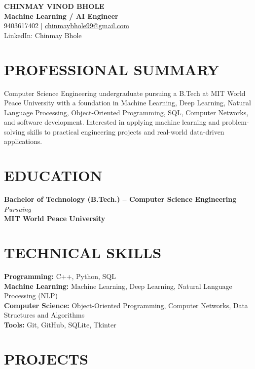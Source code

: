\documentclass[10pt,a4paper]{article}
\begin{document}
\begin{center}
{\LARGE\textbf{CHINMAY VINOD BHOLE}}\\[3pt]
\textbf{Machine Learning / AI Engineer}\\[3pt]
9403617402 \quad | \quad \href{mailto:chinmaybhole99@gmail.com}{chinmaybhole99@gmail.com}\\
LinkedIn: Chinmay Bhole
\end{center}

\section*{PROFESSIONAL SUMMARY}

Computer Science Engineering undergraduate pursuing a B.Tech at MIT World Peace University with a foundation in Machine Learning, Deep Learning, Natural Language Processing, Object-Oriented Programming, SQL, Computer Networks, and software development. Interested in applying machine learning and problem-solving skills to practical engineering projects and real-world data-driven applications.

\section*{EDUCATION}

\textbf{Bachelor of Technology (B.Tech.) -- Computer Science Engineering} \hfill \textit{Pursuing}\\
\textbf{MIT World Peace University}

\section*{TECHNICAL SKILLS}

\textbf{Programming:} C++, Python, SQL\\
\textbf{Machine Learning:} Machine Learning, Deep Learning, Natural Language Processing (NLP)\\
\textbf{Computer Science:} Object-Oriented Programming, Computer Networks, Data Structures and Algorithms\\
\textbf{Tools:} Git, GitHub, SQLite, Tkinter

\section*{PROJECTS}
\end{document}
